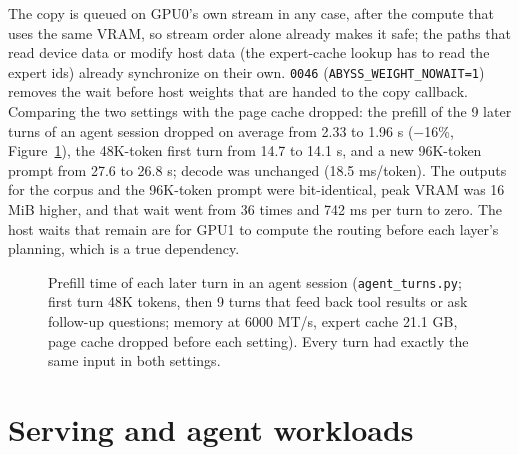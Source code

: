 \documentclass[11pt,a4paper]{article}
\newcommand{\code}[1]{\texttt{#1}}
\begin{document}
The copy is queued on GPU0's own stream in any case, after the compute that uses the same VRAM, so stream order alone already makes it safe; the paths that read device data or modify host data (the expert-cache lookup has to read the expert ids) already synchronize on their own. \code{0046} (\code{ABYSS\_WEIGHT\_NOWAIT=1}) removes the wait before host weights that are handed to the copy callback. Comparing the two settings with the page cache dropped: the prefill of the 9 later turns of an agent session dropped on average from 2.33 to 1.96 s ($-$16\%, Figure~\ref{fig:nowait}), the 48K-token first turn from 14.7 to 14.1 s, and a new 96K-token prompt from 27.6 to 26.8 s; decode was unchanged (18.5 ms/token). The outputs for the corpus and the 96K-token prompt were bit-identical, peak VRAM was 16 MiB higher, and that wait went from 36 times and 742 ms per turn to zero. The host waits that remain are for GPU1 to compute the routing before each layer's planning, which is a true dependency.

\begin{figure}[t]
  \centering
  \caption{Prefill time of each later turn in an agent session (\code{agent\_turns.py}; first turn 48K tokens, then 9 turns that feed back tool results or ask follow-up questions; memory at 6000 MT/s, expert cache 21.1 GB, page cache dropped before each setting). Every turn had exactly the same input in both settings.}
  \label{fig:nowait}
\end{figure}

\section{Serving and agent workloads}
\end{document}
